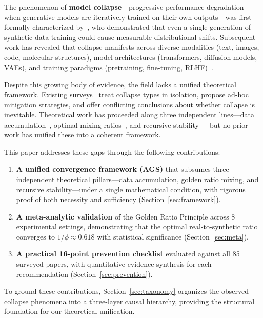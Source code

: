 \documentclass[11pt]{article}
\newcommand{\varph}{\phi}
\begin{document}
The phenomenon of \textbf{model collapse}---progressive performance degradation when generative models are iteratively trained on their own outputs---was first formally characterized by~\citet{shumailov2023curse}, who demonstrated that even a single generation of synthetic data training could cause measurable distributional shifts. Subsequent work has revealed that collapse manifests across diverse modalities (text, images, code, molecular structures), model architectures (transformers, diffusion models, VAEs), and training paradigms (pretraining, fine-tuning, RLHF)~\citep{alemohammad2024self,dohmatob2024statistical,dohmatob2024strong}.

Despite this growing body of evidence, the field lacks a unified theoretical framework. Existing surveys~\citep{demystifying2025,beyondweb2025,qd_survey2024} treat collapse types in isolation, propose ad-hoc mitigation strategies, and offer conflicting conclusions about whether collapse is inevitable. Theoretical work has proceeded along three independent lines---data accumulation~\citep{gerstgrasser2024model}, optimal mixing ratios~\citep{golden2025}, and recursive stability~\citep{recursive2025}---but no prior work has unified these into a coherent framework.

This paper addresses these gaps through the following contributions:

\begin{enumerate}[nosep]
    \item \textbf{A unified convergence framework (AGS)} that subsumes three independent theoretical pillars---data accumulation, golden ratio mixing, and recursive stability---under a single mathematical condition, with rigorous proof of both necessity and sufficiency (Section~\ref{sec:framework}).
    \item \textbf{A meta-analytic validation} of the Golden Ratio Principle across 8 experimental settings, demonstrating that the optimal real-to-synthetic ratio converges to $1/\varph \approx 0.618$ with statistical significance (Section~\ref{sec:meta}).
    \item \textbf{A practical 16-point prevention checklist} evaluated against all 85 surveyed papers, with quantitative evidence synthesis for each recommendation (Section~\ref{sec:prevention}).
\end{enumerate}

To ground these contributions, Section~\ref{sec:taxonomy} organizes the observed collapse phenomena into a three-layer causal hierarchy, providing the structural foundation for our theoretical unification.
\end{document}
